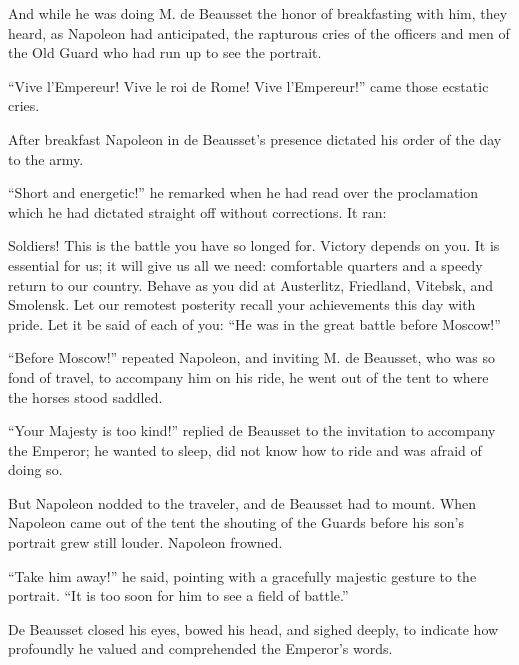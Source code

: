 And while he was doing M. de Beausset the honor of breakfasting
with him, they heard, as Napoleon had anticipated, the rapturous
cries of the officers and men of the Old Guard who had run up to
see the portrait.

``Vive l'Empereur! Vive le roi de Rome! Vive l'Empereur!'' came
those ecstatic cries.

After breakfast Napoleon in de Beausset's presence dictated his
order of the day to the army.

``Short and energetic!'' he remarked when he had read over the
proclamation which he had dictated straight off without
corrections. It ran:

Soldiers! This is the battle you have so longed for. Victory
depends on you. It is essential for us; it will give us all we
need: comfortable quarters and a speedy return to our
country. Behave as you did at Austerlitz, Friedland, Vitebsk, and
Smolensk. Let our remotest posterity recall your achievements
this day with pride. Let it be said of each of you: ``He was in
the great battle before Moscow!''

``Before Moscow!'' repeated Napoleon, and inviting M. de
Beausset, who was so fond of travel, to accompany him on his
ride, he went out of the tent to where the horses stood saddled.

``Your Majesty is too kind!'' replied de Beausset to the
invitation to accompany the Emperor; he wanted to sleep, did not
know how to ride and was afraid of doing so.

But Napoleon nodded to the traveler, and de Beausset had to
mount. When Napoleon came out of the tent the shouting of the
Guards before his son's portrait grew still louder. Napoleon
frowned.

``Take him away!'' he said, pointing with a gracefully majestic
gesture to the portrait. ``It is too soon for him to see a field
of battle.''

De Beausset closed his eyes, bowed his head, and sighed deeply,
to indicate how profoundly he valued and comprehended the
Emperor's words.


